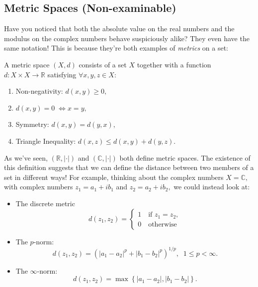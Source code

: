 \documentclass[
  10pt,
  a4paper]{article}
\providecommand{\tightlist}{%
  \setlength{\itemsep}{0pt}\setlength{\parskip}{0pt}}
\theoremstyle{plain}
\theoremstyle{definition}
\theoremstyle{plain}
\theoremstyle{plain}
\theoremstyle{plain}
\theoremstyle{plain}
\theoremstyle{definition}
\theoremstyle{definition}
\theoremstyle{remark}
\theoremstyle{remark}
\let\BeginKnitrBlock\begin \let\EndKnitrBlock\end
\begin{document}
\hypertarget{metric-spaces-non-examinable}{%
\subsection{Metric Spaces (Non-examinable)}\label{metric-spaces-non-examinable}}

Have you noticed that both the absolute value on the real numbers and the modulus on the complex numbers behave suspiciously alike? They even have the same notation! This is because they're both examples of \emph{metrics} on a set:

\BeginKnitrBlock{definition}[Metric Space]
{\label{def:def3} }A metric space \((X,d)\) consists of a set \(X\) together with a function \(d: X\times X \to \mathbb{R}\) satisfying \(\forall x,y,z \in X:\)

\begin{enumerate}
\def\labelenumi{\roman{enumi})}
\tightlist
\item
  Non-negativity: \(d(x,y) \geq 0,\)
\item
  \(d(x,y) = 0 \; \Leftrightarrow x = y,\)
\item
  Symmetry: \(d(x,y) = d(y,x),\)
\item
  Triangle Inequality: \(d(x,z) \leq d(x,y) + d(y,z).\)
\end{enumerate}
\EndKnitrBlock{definition}

As we've seen, \((\mathbb{R}, \lvert \cdot \rvert)\) and \((\mathbb{C}, \lvert \cdot \rvert)\) both define metric spaces. The existence of this definition suggests that we can define the distance between two members of a set in different ways! For example, thinking about the complex numbers \(X = \mathbb{C},\) with complex numbers \(z_1 = a_1 + ib_1\) and \(z_2 = a_2 + ib_2,\) we could instead look at:

\begin{itemize}
\tightlist
\item
  The discrete metric \[d(z_1,z_2) = \begin{cases} 1 \quad \text{if $z_1=z_2$},\\
  0 \quad \text{otherwise}\end{cases}\]
\item
  The \(p\)-norm: \[d(z_1,z_2) = \left(\lvert a_1-a_2\rvert^p + \lvert b_1-b_2\rvert ^p\right)^{1/p},\;\; 1\leq p < \infty.\]
\item
  The \(\infty\)-norm: \[d(z_1,z_2) = \max\left\lbrace \lvert a_1 - a_2 \rvert, \lvert b_1 - b_2 \rvert\right\rbrace.\]
\end{itemize}
\end{document}
